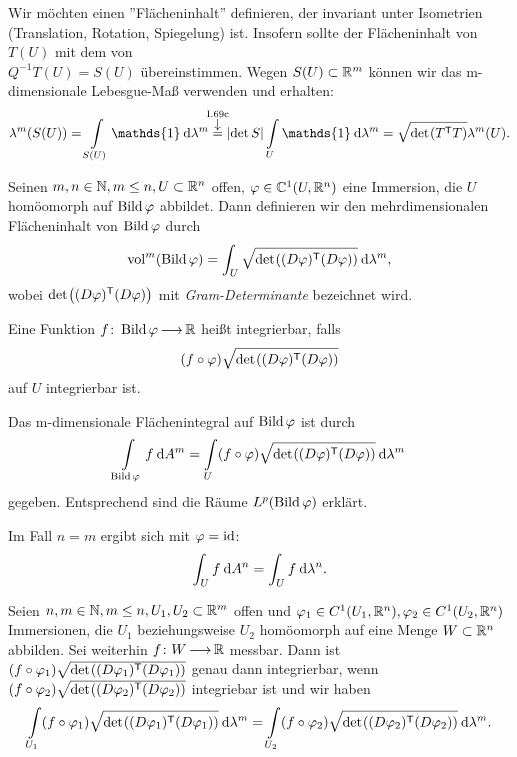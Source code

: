 \documentclass[skript.tex]{subfiles}
\begin{document}
Wir möchten einen ''Flächeninhalt'' definieren, der invariant unter Isometrien (Translation, Rotation, Spiegelung) ist. Insofern sollte der Flächeninhalt von $T(U)$ mit dem von \\$Q^{-1} T(U) = S(U)$ übereinstimmen. Wegen $S(U) \subset \mathbb{R}^m$ können wir das m-dimensionale Lebesgue-Maß verwenden und erhalten:
\[
	\lambda^m (S(U)) = \lint_{S(U)} \mathds{1} \md \lambda^m \darrow{\textup{I.69c}}{=} \abs{\det S} \lint_U \mathds{1} \md \lambda^m = \sqrt{\det \pr{T^\tp T}} \lambda^m(U).
\]


\begin{defin}
	Seinen $m,n \in \mathbb{N}, m\leq n, U \subset {\mathbb{R}^n}$ offen, $\varphi \in \mathbb{C}^1(U,{\mathbb{R}^n})$ eine Immersion, die $U$ homöomorph auf $\operatorname{Bild} \varphi$ abbildet. Dann definieren wir den mehrdimensionalen Flächeninhalt von $\operatorname{Bild} \varphi$ durch
	\[
		\vol^m(\image \varphi) = \int_U \sqrt{\det \pr{(D\varphi)^\tp (D\varphi)}} \md \lambda^m ,
	\]
	wobei $\det \pr{(D\varphi)^\tp (D\varphi)}$ mit \textit{Gram-Determinante} bezeichnet wird.
	
	Eine Funktion $f\colon \operatorname{Bild} \varphi \kern -1pt \longrightarrow \kern -1pt \mathbb{R}$ heißt integrierbar, falls
	\[
		(f \circ \varphi) \sqrt{\det \pr{(D\varphi)^\tp (D\varphi)}}
	\]
	auf $U$ integrierbar ist.
	
	Das m-dimensionale Flächenintegral auf $\operatorname{Bild} \varphi$ ist durch
	\[
		\lint_{\image \varphi} f \md A^m = \lint_U (f\circ \varphi) \sqrt{\det \pr{(D\varphi)^\tp (D\varphi)}} \md \lambda^m
	\]
	gegeben. Entsprechend sind die Räume $L^p (\operatorname{Bild} \varphi)$ erklärt.
	
	Im Fall $n=m$ ergibt sich mit $\varphi = \mathrm{id}$:
	\[
		\int_U f \: \mathrm{d} A^n = \int_U f \: \mathrm{d} \lambda^n.
	\]
\end{defin}

\begin{lem}
	Seien $n,m \in \mathbb{N}, m\leq n, U_1, U_2 \subset \mathbb{R}^m$ offen und $\varphi_1 \in C^1(U_1, {\mathbb{R}^n}), \varphi_2 \in C^1(U_2, {\mathbb{R}^n})$ Immersionen, die $U_1$ beziehungsweise $U_2$ homöomorph auf eine Menge $W\subset {\mathbb{R}^n}$ abbilden. Sei weiterhin $f\colon W \kern -1pt \longrightarrow \kern -1pt \mathbb{R}$ messbar. Dann ist $(f\circ \varphi_1) \sqrt{\det \pr{(D\varphi_1)^\tp (D\varphi_1)}}$ genau dann integrierbar, wenn $(f \circ \varphi_2) \sqrt{\det \pr{(D\varphi_2)^\tp (D\varphi_2)}}$ integriebar ist und wir haben
	\[
		\lint_{U_1} (f \circ \varphi_1) \sqrt{\det \pr{(D\varphi_1)^\tp (D\varphi_1)}} \md \lambda^m = \lint_{U_2} (f\circ \varphi_2) \sqrt{\det \pr{(D\varphi_2)^\tp (D\varphi_2)}} \md \lambda^m.
	\]
\end{lem}
\end{document}
